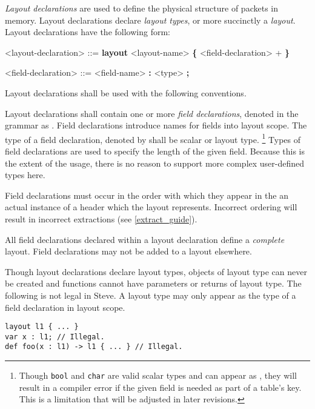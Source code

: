 \textit{Layout declarations} are used to define the physical structure of packets in memory. Layout declarations declare \textit{layout types}, or more succinctly a \textit{layout}. Layout declarations have the following form:

\begin{minip}
\begin{grammar}
<layout-declaration> ::=
\textbf{layout} <layout-name> 
\textbf{\{}
	<field-declaration> +
\textbf{\}}

<field-declaration> ::=
<field-name> \textbf{:} <type> \textbf{;}
\end{grammar}
\end{minip}

Layout declarations shall be used with the following conventions.

Layout declarations shall contain one or more \textit{field declarations}, denoted in the grammar as . Field declarations introduce names for fields into layout scope. The type of a field declaration, denoted by  shall be scalar or layout type. \footnote{Though \texttt{bool} and \texttt{char} are valid scalar types and can appear as , they will result in a compiler error if the given field is needed as part of a table's key. This is a limitation that will be adjusted in later revisions.} Types of field declarations are used to specify the length of the given field. Because this is the extent of the usage, there is no reason to support more complex user-defined types here. 

Field declarations must occur in the order with which they appear in the an actual instance of a header which the layout represents. Incorrect ordering will result in incorrect extractions (see \ref{extract_guide}).

All field declarations declared within a layout declaration define a \textit{complete} layout. Field declarations may not be added to a layout elsewhere.

Though layout declarations declare layout types, objects of layout type can never be created and functions cannot have parameters or returns of layout type. The following is not legal in Steve. A layout type may only appear as the type of a field declaration in layout scope.

\noindent\begin{minipage}{\linewidth}
\begin{lstlisting}
layout l1 { ... }
var x : l1; // Illegal.
def foo(x : l1) -> l1 { ... } // Illegal.
\end{lstlisting}
\end{minipage}

